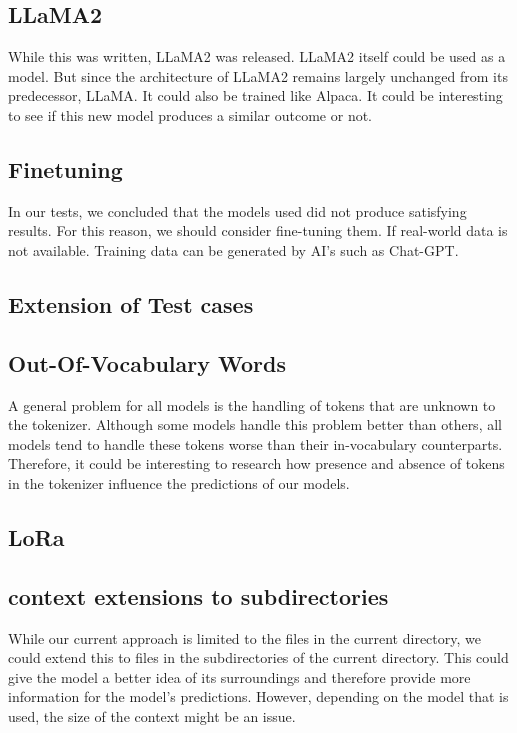 \subsection{LLaMA2}

While this was written, LLaMA2 was released.\cite{touvron2023llama2}
LLaMA2 itself could be used as a model. But since the architecture of LLaMA2 remains largely unchanged from its predecessor, LLaMA. It could also be trained like Alpaca. It could be interesting to see if this new model produces a similar outcome or not.


\subsection{Finetuning}

In our tests, we concluded that the models used did not produce satisfying results. For this reason, we should consider fine-tuning them. If real-world data is not available. Training data can be generated by AI's such as Chat-GPT. 


\subsection{Extension of Test cases}


\subsection{Out-Of-Vocabulary Words}

A general problem for all models is the handling of tokens that are unknown to the tokenizer. Although some models handle this problem better than others, all models tend to handle these tokens worse than their in-vocabulary counterparts. Therefore, it could be interesting to research how  presence and absence of tokens in the tokenizer influence the predictions of our models.


\subsection{LoRa}


\subsection{context extensions to subdirectories}

While our current approach is limited to the files in the current directory, we could extend this to files in the subdirectories of the current directory. This could give the model a better idea of its surroundings and therefore provide more information for the model's predictions. However, depending on the model that is used, the size of the context might be an issue.


